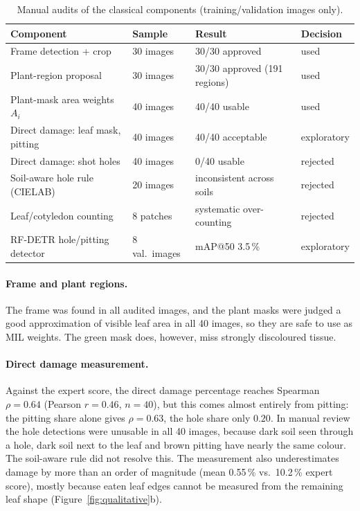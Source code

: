 \begin{table}[tb]
\centering
\small
\caption{Manual audits of the classical components (training/validation images only).}
\label{tab:classical}
\begin{tabular}{@{}llll@{}}
\toprule
Component & Sample & Result & Decision \\
\midrule
Frame detection + crop            & 30 images  & 30/30 approved             & used \\
Plant-region proposal             & 30 images  & 30/30 approved (191 regions)  & used \\
Plant-mask area weights $A_i$     & 40 images  & 40/40 usable               & used \\
Direct damage: leaf mask, pitting & 40 images  & 40/40 acceptable           & exploratory \\
Direct damage: shot holes         & 40 images  & 0/40 usable                & rejected \\
Soil-aware hole rule (CIELAB)     & 20 images  & inconsistent across soils  & rejected \\
Leaf/cotyledon counting           & 8 patches  & systematic over-counting   & rejected \\
RF-DETR hole/pitting detector     & 8 val.\ images & mAP@50 3.5\,\%         & exploratory \\
\bottomrule
\end{tabular}
\end{table}

\paragraph{Frame and plant regions.} The frame was found in all audited images, and the plant
masks were judged a good approximation of visible leaf area in all 40 images, so they are safe to
use as MIL weights. The green mask does, however, miss strongly discoloured tissue.

\paragraph{Direct damage measurement.} Against the expert score, the direct damage
percentage reaches Spearman $\rho = 0.64$ (Pearson $r = 0.46$, $n=40$), but this comes almost
entirely from pitting: the pitting share alone gives $\rho = 0.63$, the hole share only $0.20$.
In manual review the hole detections were unusable in all 40 images, because dark soil seen
through a hole, dark soil next to the leaf and brown pitting have nearly the same colour. The
soil-aware rule did not resolve this. The measurement also underestimates damage by more than an
order of magnitude (mean 0.55\,\% vs.\ 10.2\,\% expert score), mostly because eaten leaf edges
cannot be measured from the remaining leaf shape (Figure~\ref{fig:qualitative}b).

